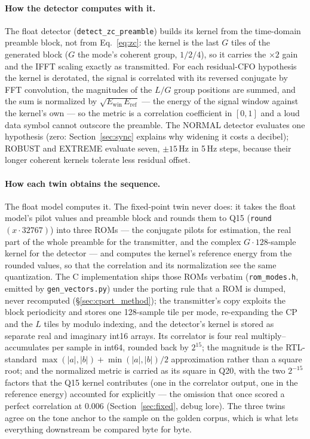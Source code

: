 \paragraph{How the detector computes with it.}  The float detector
(\texttt{detect\_zc\_preamble}) builds its kernel from the
time-domain preamble block, not from Eq.~\eqref{eq:zc}: the kernel is
the last $G$ tiles of the generated block ($G$ the mode's coherent
group, $1 / 2 / 4$), so it carries the $\times 2$ gain and the IFFT
scaling exactly as transmitted.  For each residual-CFO hypothesis the
kernel is derotated, the signal is correlated with its reversed
conjugate by FFT convolution, the magnitudes of the $L/G$ group
positions are summed, and the sum is normalized by
$\sqrt{E_{\mathrm{win}}\,E_{\mathrm{ref}}}$ --- the energy of the
signal window against the kernel's own --- so the metric is a
correlation coefficient in $[0, 1]$ and a loud data symbol cannot
outscore the preamble.  The NORMAL detector evaluates one hypothesis
(zero: Section~\ref{sec:sync} explains why widening it costs a
decibel); ROBUST and EXTREME evaluate seven, $\pm 15$\,Hz in 5\,Hz
steps, because their longer coherent kernels tolerate less residual
offset.

\paragraph{How each twin obtains the sequence.}  The float model
computes it.  The fixed-point twin never does: it takes the float
model's pilot values and preamble block and rounds them to Q15
(\texttt{round}$(x \cdot 32767)$) into three ROMs --- the conjugate
pilots for estimation, the real part of the whole preamble for the
transmitter, and the complex $G \cdot 128$-sample kernel for the
detector --- and computes the kernel's reference energy from the
rounded values, so that the correlation and its normalization see the
same quantization.  The C implementation ships those ROMs verbatim
(\texttt{rom\_modes.h}, emitted by \texttt{gen\_vectors.py}) under the
porting rule that a ROM is dumped, never recomputed
(\S\ref{sec:cport_method}); the transmitter's copy exploits the block
periodicity and stores one 128-sample tile per mode, re-expanding
the CP and the $L$ tiles by modulo indexing, and the detector's kernel
is stored as separate real and imaginary int16 arrays.  Its correlator
is four real multiply--accumulates per sample in int64, rounded back by
$2^{15}$; the magnitude is the RTL-standard
$\max(|a|,|b|) + \min(|a|,|b|)/2$ approximation rather than a square
root; and the normalized metric is carried as its square in Q20, with
the two $2^{-15}$ factors that the Q15 kernel contributes (one in the
correlator output, one in the reference energy) accounted for
explicitly --- the omission that once scored a perfect correlation at
0.006 (Section~\ref{sec:fixed}, debug lore).  The three twins agree on
the tone anchor to the sample on the golden corpus, which is what
lets everything downstream be compared byte for byte.

